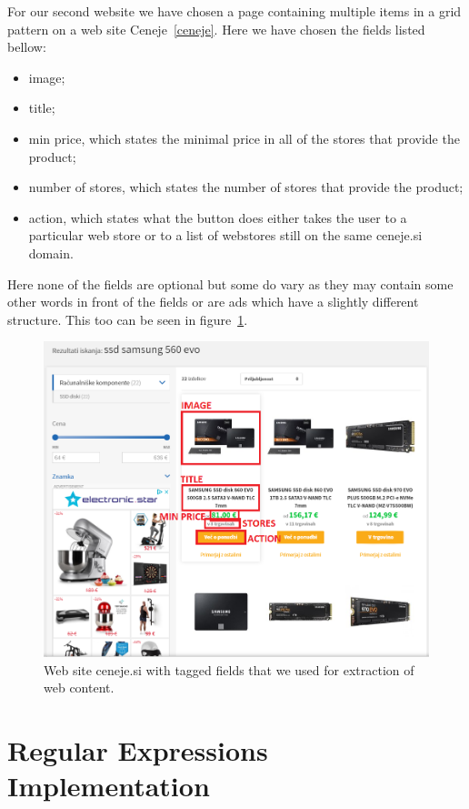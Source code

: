 \documentclass[9pt]{IEEEtran}
\begin{document}
For our second website we have chosen a page containing multiple items in a grid pattern on a web site Ceneje~\ref{ceneje}.
Here we have chosen the fields listed bellow:
\begin{itemize}
\item{image;}
\item{title;}
\item{min price, which states the minimal price in all of the stores that provide the product;}
\item{number of stores, which states the number of stores that provide the product;}
\item{action, which states what the button does either takes the user to a particular web store or to a list of webstores still on the same ceneje.si domain.}
\end{itemize}
Here none of the fields are optional but some do vary as they may contain some other words in front of the fields or are ads which have a slightly different structure.
This too can be seen in figure~\ref{fig_ceneje}.

\begin{figure}[ht]
    \centering
    \includegraphics[width=1\columnwidth]{ceneje.png}
    \caption{Web site ceneje.si with tagged fields that we used for extraction of web content.}
    \label{fig_ceneje}
\end{figure}

\section{Regular Expressions Implementation}
\end{document}
